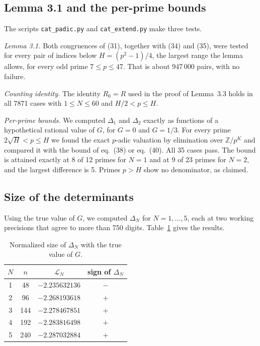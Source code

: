 \documentclass[11pt]{article}
\begin{document}
\subsection{Lemma 3.1 and the per-prime bounds}

The scripts \texttt{cat\_padic.py} and \texttt{cat\_extend.py} make three tests.

\emph{Lemma 3.1.} Both congruences of (31), together with (34) and (35), were tested for every pair of indices below $H=(p^2-1)/4$, the largest range the lemma allows, for every odd prime $7\le p\le47$. That is about 947\,000 pairs, with no failure.

\emph{Counting identity.} The identity $R_0=R$ used in the proof of Lemma~3.3 holds in all 7871 cases with $1\le N\le60$ and $H/2<p\le H$.

\emph{Per-prime bounds.} We computed $\Delta_1$ and $\Delta_2$ exactly as functions of a hypothetical rational value of $G$, for $G=0$ and $G=1/3$. For every prime $2\sqrt{H}<p\le H$ we found the exact $p$-adic valuation by elimination over $\mathbb{Z}/p^K$ and compared it with the bound of eq.~(38) or eq.~(40). All 35 cases pass. The bound is attained exactly at 8 of 12 primes for $N=1$ and at 9 of 23 primes for $N=2$, and the largest difference is 5. Primes $p>H$ show no denominator, as claimed.

\subsection{Size of the determinants}

Using the true value of $G$, we computed $\Delta_N$ for $N=1,\dots,5$, each at two working precisions that agree to more than 750 digits. Table~\ref{tab:size} gives the results.

\begin{table}[ht]
\centering
\begin{tabular}{cccc}
\hline
$N$ & $n$ & $\mathcal{L}_N$ & sign of $\Delta_N$\\
\hline
1 & 48 & $-2.235632136$ & $-$\\
2 & 96 & $-2.268193618$ & $+$\\
3 & 144 & $-2.278467851$ & $+$\\
4 & 192 & $-2.283816498$ & $+$\\
5 & 240 & $-2.287032884$ & $+$\\
\hline
\end{tabular}
\caption{Normalized size of $\Delta_N$ with the true value of $G$.}
\label{tab:size}
\end{table}
\end{document}
